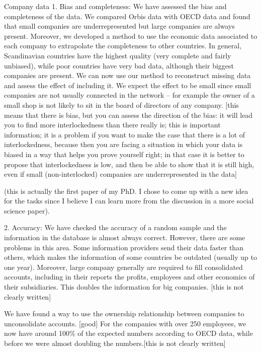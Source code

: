 Company data
1. Bias and completeness: We have assessed the bias and completeness of the data. We compared Orbis data with OECD data and found that small companies are underrepresented but large companies are always present. Moreover, we developed a method to use the economic data associated to each company to extrapolate the completeness to other countries. In general, Scandinavian countries have the highest quality (very complete and fairly unbiased), while poor countries have very bad data, although their biggest companies are present.
We can now use our method to reconstruct missing data and assess the effect of including it. We expect the effect to be small since small companies are not usually connected in the network -- for example the owner of a small shop is not likely to sit in the board of directors of any company.
[this means that there is bias, but you can assess the direction of the bias: it will lead you to find more interlockedness than there really is; this is important information; it is a problem if you want to make the case that there is a lot of interlockedness, because then you are facing a situation in which your data is biased in a way that  helps you prove yourself right; in that case it is better to propose that interlockedness is low, and then be able to show that it is still high, even if small (non-interlocked) companies are underrepresented in the data]

(this is actually the first paper of my PhD. I chose to come up with a new idea for the tasks since I believe I can learn more from the discussion in a more social science paper).

2.  Accuracy: We have checked the accuracy of a random sample and the information in the database is almost always correct. However, there are some problems in this area. Some information providers send their data faster than others, which makes the information of some countries be outdated (usually up to one year). Moreover, large company generally are required to fill consolidated accounts, including in their reports the profits, employees and other economics of their subsidiaries.  This doubles the information for big companies. [this is not clearly written]

We have found a way to use the ownership relationship between companies to unconsolidate accounts. [good] For the companies with over 250 employees, we now have around 100\% of the expected numbers according to OECD data, while before we were almost doubling the numbers.[this is not clearly written]

